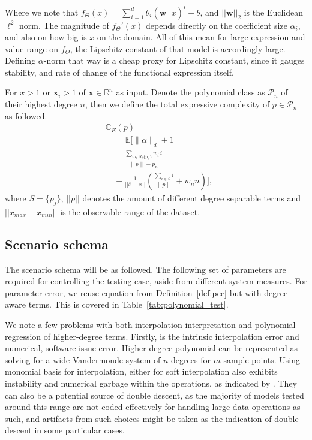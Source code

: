 Where we note that $f_{\Theta}(x)=\sum_{i=1}^{d} \theta_i \left( \mathbf{w}^\top x \right)^i + b$, and $||\mathbf{w}||_{2}$ is the Euclidean $\ell^{2}$ norm. The magnitude of $f_{\Theta}'(x)$ depends directly on the coefficient size $\alpha_{i}$, and also on how big is $x$ on the domain. All of this mean for large expression and value range on $f_{\Theta}$, the Lipschitz constant of that model is accordingly large. Defining $\alpha$-norm that way is a cheap proxy for Lipschitz constant, since it gauges stability, and rate of change of the functional expression itself. 

\begin{definition}\label{def:pec}
    For $x>1$ or $\mathbf{x}_{i}>1$ of $\mathbf{x}\in\mathbb{R}^{n}$ as input. Denote the polynomial class as $\mathcal{P}_{n}$ of their highest degree $n$, then we define the total expressive complexity of $p\in \mathcal{P}_{n}$ as followed.
\begin{equation}
    \begin{split}
        &\mathbb{C}_{E}(p)\\
& \quad = \mathbb{E}\!\Bigg[
\lVert \alpha \rVert_{d} + 1\\
& \quad + \frac{\sum_{i\in S\setminus\{p_{n}\}} w_i\,i}{\|p\|-p_{n}}\\
&\quad + \frac{1}{||\overline{x}-\underline{x}||}\!\left(
\frac{\sum_{i\in S} i}{\lVert p\rVert } + w_{n}n
\right)
\Bigg],
    \end{split}
\end{equation}
    where $S=\{p_{j}\}$, $||p||$ denotes the amount of different degree separable terms and $||x_{max}-x_{min}||$ is the observable range of the dataset. 
\end{definition}

\subsection{Scenario schema}
The scenario schema will be as followed. The following set of parameters are required for controlling the testing case, aside from different system measures. For parameter error, we reuse equation from Definition~\ref{def:pec} but with degree aware terms. This is covered in Table~\ref{tab:polynomial_test}.

We note a few problems with both interpolation interpretation and polynomial regression of higher-degree terms. Firstly, is the intrinsic interpolation error and numerical, software issue error. Higher degree polynomial can be represented as solving for a wide Vandermonde system of $n$ degrees for $m$ sample points. Using monomial basis for interpolation, either for soft interpolation also exhibits instability and numerical garbage within the operations, as indicated by \cite{Shen_2025}. They can also be a potential source of double descent, as the majority of models tested around this range are not coded effectively for handling large data operations as such, and artifacts from such choices might be taken as the indication of double descent in some particular cases. 

